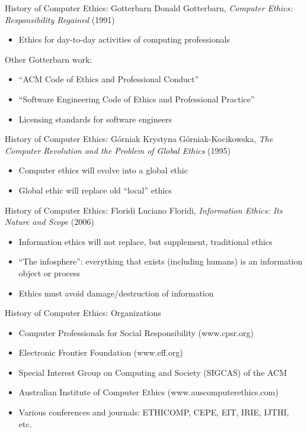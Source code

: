 \documentclass{beamer}
\begin{document}
\begin{frame}{History of Computer Ethics: Gotterbarn}
Donald Gotterbarn, \emph{Computer Ethics: Responsibility Regained} (1991)
\begin{itemize}
\item Ethics for day-to-day activities of computing professionals
\end{itemize}
\bigskip
Other Gotterbarn work:
\begin{itemize}
\item ``ACM Code of Ethics and Professional Conduct''
\item ``Software Engineering Code of Ethics and Professional Practice''
\item Licensing standards for software engineers
\end{itemize}
\end{frame}

\begin{frame}{History of Computer Ethics: G\'{o}rniak}
Krystyna G\'{o}rniak-Kocikowska, \emph{The Computer Revolution and the Problem of Global Ethics} (1995)
\begin{itemize}
\item Computer ethics will evolve into a global ethic
\item Global ethic will replace old ``local'' ethics
\end{itemize}
\end{frame}

\begin{frame}{History of Computer Ethics: Floridi}
Luciano Floridi, \emph{Information Ethics: Its Nature and Scope} (2006)
\begin{itemize}
\item Information ethics will not replace, but supplement, traditional ethics
\item ``The infosphere'': everything that exists (including humans) is an information object or process
\item Ethics must avoid damage/destruction of information
\end{itemize}
\end{frame}

\begin{frame}{History of Computer Ethics: Organizations}
\begin{itemize}
\item Computer Professionals for Social Responsibility (www.cpsr.org)
\item Electronic Frontier Foundation (www.eff.org)
\item Special Interest Group on Computing and Society (SIGCAS) of the ACM
\item Australian Institute of Computer Ethics (www.auscomputerethics.com)
\item Various conferences and journals: ETHICOMP, CEPE, EIT, IRIE, IJTHI, etc.
\end{itemize}
\end{frame}
\end{document}
